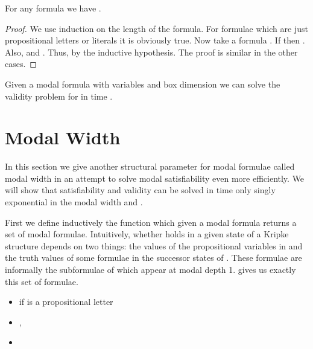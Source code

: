 \documentclass{llncs}
\begin{document}
\begin{theorem}

For any formula  we have .

\end{theorem}

\begin{proof}

We use induction on the length of the formula. For formulae which are just
propositional letters or literals it is obviously true. Now take a formula
. If  then . Also,  and . Thus,  by the inductive hypothesis. The proof is similar in the other
cases.

\end{proof}

\begin{corollary}

Given a modal formula  with  variables and box dimension 
we can solve the validity problem for  in time .


\end{corollary}
 
\newcommand{\mw}{\textrm{mw}}

\section{Modal Width} \label{sec:width}

In this section we give another structural parameter for modal
formulae called modal width in an attempt to solve modal
satisfiability even more efficiently. We will show that
satisfiability and validity can be solved in time only singly
exponential in the modal width and .

First we define inductively the function  which given a modal formula
returns a set of modal formulae. Intuitively, whether  holds in a given
state  of a Kripke structure depends on two things: the values of the
propositional variables in  and the truth values of some formulae 
in the successor states of . These formulae are informally the subformulae
of  which appear at modal depth 1.  gives us exactly this set of
formulae.

\begin{itemize}

\item  if  is a propositional letter

\item , 

\item 

\end{itemize}
\end{document}
